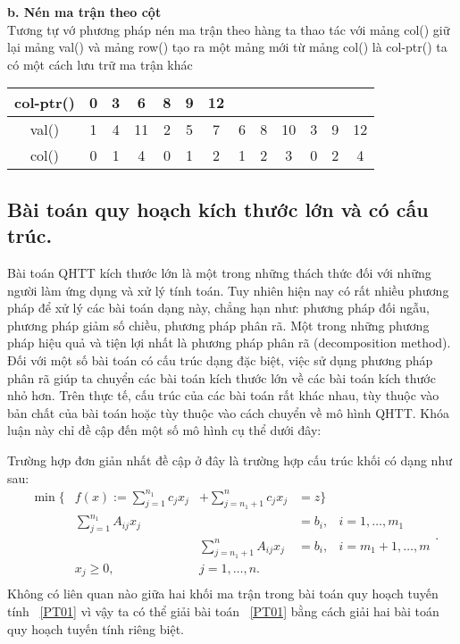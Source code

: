\textbf{b. Nén ma trận theo cột}\\
Tương tự vớ phương pháp nén ma trận theo hàng ta thao tác với mảng col() giữ lại mảng val() và mảng row() tạo ra một mảng mới từ mảng col() là col-ptr() ta có một cách lưu trữ ma trận khác
\begin{center}
\begin{tabular}{|c|c|c|c|c|c|c|c|c|c|c|c|c|}
\hline col-ptr()&0&3&6&8&9&12&&&&&&\\
\hline val()&1&4&11&2&5&7&6&8&10&3&9&12\\
\hline col()&0&1&4&0&1&2 &1&2&3&0&2&4\\
\hline
\end{tabular}
\end{center}

\subsection{Bài toán quy hoạch kích thước lớn và có cấu trúc. }
Bài toán QHTT kích thước lớn là một trong những thách thức đối với những người làm ứng dụng và xử lý tính toán. Tuy nhiên hiện nay có rất nhiều phương pháp để xử lý các bài toán dạng này, chẳng hạn như: phương pháp đối ngẫu, phương pháp giảm số chiều, phương pháp phân rã. Một trong những phương pháp hiệu quả và tiện lợi nhất là phương pháp phân rã (decomposition method). Đối với một số bài toán có cấu trúc dạng đặc biệt, việc sử dụng phương pháp phân rã giúp ta chuyển các bài toán kích thước lớn về các bài toán kích thước nhỏ hơn. Trên thực tế, cấu trúc của các bài toán rất khác nhau, tùy thuộc vào bản chất của bài toán hoặc tùy thuộc vào cách chuyển về mô hình QHTT. Khóa luận này chỉ đề cập đến một số mô hình cụ thể dưới đây:

 Trường hợp đơn giản nhất đề cập ở đây là trường hợp cấu trúc khối có dạng như sau:
\begin{equation}\label{PT01}
 \begin{array}{lllll}
\min\Big\{&f(x) := \sum_{j = 1}^{n_1} c_j x_j &+ \sum_{j = n_1 + 1}^{n} c_j x_j & = z \Big\}\\
&\sum_{j = 1}^{n_1} A_{ij} x_j& & = b_i, & i = 1, \ldots, m_1\\
&&\sum_{j = n_1 + 1}^{n} A_{ij} x_j & = b_i, & i = m_1 + 1, \ldots, m\\
&x_j \geq 0, &j = 1, \ldots, n.\\
\end{array}.
\end{equation}
Không có liên quan nào giữa hai khối ma trận trong bài toán quy hoạch tuyến tính ~\ref{PT01} vì vậy ta có thể giải bài toán ~\ref{PT01} bằng cách giải hai bài toán quy hoạch tuyến tính riêng biệt.

